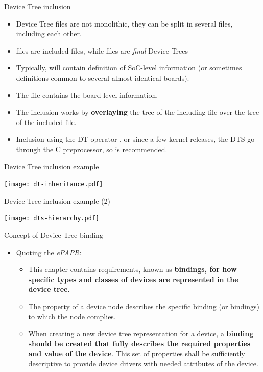 \documentclass[obeyspaces,spaces,hyphens]{beamer}
\begin{document}
\begin{frame}[fragile]{Device Tree inclusion}
  \begin{itemize}
  \item Device Tree files are not monolithic, they can be split in
    several files, including each other.
  \item {} files are included files, while  files
    are {\em final} Device Trees
  \item Typically,  will contain definition of SoC-level
    information (or sometimes definitions common to several almost
    identical boards).
  \item The  file contains the board-level information.
  \item The inclusion works by {\bf overlaying} the tree of the
    including file over the tree of the included file.
  \item Inclusion using the DT operator , or since a
    few kernel releases, the DTS go through the C preprocessor, so
     is recommended.
  \end{itemize}
\end{frame}

\begin{frame}{Device Tree inclusion example}
  \begin{center}
    \texttt{[image: dt-inheritance.pdf]}
  \end{center}
\end{frame}

\begin{frame}{Device Tree inclusion example (2)}
  \begin{center}
    \texttt{[image: dts-hierarchy.pdf]}
  \end{center}
\end{frame}

\begin{frame}{Concept of Device Tree binding}
  \begin{itemize}
  \item Quoting the {\em ePAPR}:
    \begin{itemize}
    \item This chapter contains requirements, known as {\bf bindings,
        for how specific types and classes of devices are represented
        in the device tree}.
    \item The  property of a device node describes
      the specific binding (or bindings) to which the node complies.
    \item When creating a new device tree representation for a device,
      a {\bf binding should be created that fully describes the
        required properties and value of the device}. This set of
      properties shall be sufficiently descriptive to provide device
      drivers with needed attributes of the device.
    \end{itemize}
  \end{itemize}
\end{frame}
\end{document}
